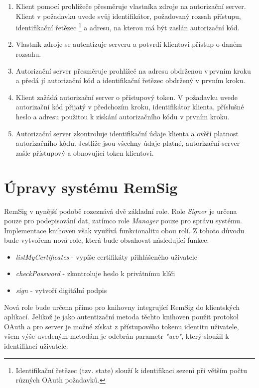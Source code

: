 \documentclass[]{fithesis3}
\begin{document}
	\begin{enumerate}
		\item {
		Klient pomocí prohlížeče přesměruje vlastníka zdroje na autorizační server. Klient v 				požadavku uvede svůj identifikátor, požadovaný rozsah přístupu,  identifikační řetězec
			\footnote {
			Identifikační řetězec (tzv. state) slouží k identifikaci sezení při větším počtu různých 				OAuth požadavků.
			}	 
		a adresu, na kterou má být zaslán autorizační kód.
		}
		\item
		Vlastník zdroje se autentizuje serveru a potvrdí klientovi přístup o daném rozsahu.
		\item
		Autorizační server přesměruje prohlížeč na adresu obdrženou v\,prvním kroku a předá jí 			autorizační kód a identifikační řetězec obdržený v prvním kroku.
		\item
		Klient zažádá autorizační server o přístupový token. V požadavku uvede autorizační kód 			přijatý v předchozím kroku, identifikátor klienta, příslušné heslo a adresu použitou k 				získání autorizačního kódu v prvním kroku. 
		\item	
		Autorizační server zkontroluje identifikační údaje klienta a ověří platnost autorizačního 				kódu. Jestliže jsou všechny údaje platné, autorizační server zašle přístupový a obnovující 			token klientovi.

	\end{enumerate}

	\section{Úpravy systému RemSig}

	RemSig v nynější podobě rozeznává dvě základní role. Role \textit{Signer} je určena pouze pro 		podepisování dat, zatímco role \textit{Manager} pouze pro správu systému. Implementace 			knihoven však využívá funkcionalitu obou rolí. Z tohoto důvodu bude vytvořena nová role, 			která bude obsahovat následující funkce:
	\begin{itemize}
		\item \textit{listMyCertificates} - vypíše certifikáty přihlášeného uživatele

		\item \textit{checkPassword} - zkontroluje heslo k privátnímu klíči

		\item \textit{sign} - vytvoří digitální podpis
	\end{itemize}

	Nová role bude určena přímo pro knihovny integrující RemSig do klientských aplikací. Jelikož 		je jako autentizační metoda těchto knihoven použit protokol OAuth a pro server je možné 			získat z přístupového tokenu identitu uživatele, všem výše uvedeným metodám je odebrán 		parametr \textit{"uco"}, který sloužil k identifikaci uživatele.
\end{document}
